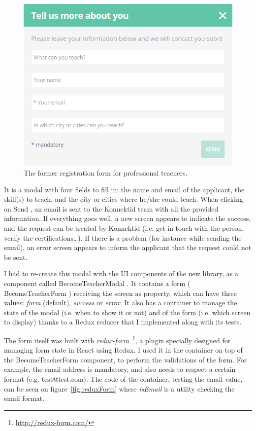  \begin{figure}[H]
    \centering
    \includegraphics[scale=0.6]{figure/signUpFlow.png}
    \caption{The former registration form for professional teachers.}
    \label{fig:signUpFlow}
\end{figure}

It is a modal with four fields to fill in: the name and email of the applicant, the skill(s) to teach, and the city or cities where he/she could teach. When clicking on \guillemotleft{} Send \guillemotright{}, an email is sent to the Konnektid team with all the provided information. If everything goes well, a new screen appears to indicate the success, and the request can be treated by Konnektid (i.e. get in touch with the person, verify the certifications\ldots). If there is a problem (for instance while sending the email), an error screen appears to inform the applicant that the request could not be sent.

I had to re-create this modal with the UI components of the new library, as a component called \guillemotleft{} BecomeTeacherModal \guillemotright{}. It contains a form (\guillemotleft{} BecomeTeacherForm \guillemotright{}) receiving the screen as property, which can have three values: \textit{form} (default), \textit{success} or \textit{error}. It also has a container to manage the state of the modal (i.e. when to show it or not) and of the form (i.e. which screen to display) thanks to a Redux reducer that I implemented along with its tests. 

The form itself was built with \textit{redux-form}~\footnote{\url{http://redux-form.com/}}, a plugin specially designed for managing form state in React using Redux. I used it in the container on top of the \guillemotleft{} BecomeTeacherForm \guillemotright{} component, to perform the validations of the form. For example, the email address is mandatory, and also needs to respect a certain format (e.g. test@test.com). The code of the container, testing the email value, can be seen on {\sc figure}~\ref{fig:reduxForm} where \textit{isEmail} is a utility checking the email format.

